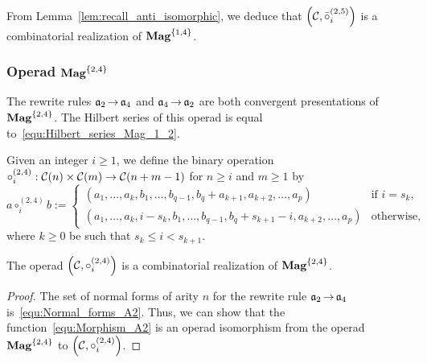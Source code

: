 From Lemma~\ref{lem:recall_anti_isomorphic}, we deduce that
$\left(\mathcal{C}, \bar{\circ}_i^{(2,5)}\right)$ is a combinatorial
realization of $\mathbf{Mag}^{\{1, 4\}}$.
\medbreak

\subsubsection{Operad $\mathbf{Mag}^{\{2, 4\}}$}
The rewrite rules $\mathfrak{a}_2 \operatorname{\to} \mathfrak{a}_4$ and $\mathfrak{a}_4 \operatorname{\to} \mathfrak{a}_2$ are both
convergent presentations of $\mathbf{Mag}^{\{2, 4\}}$. The Hilbert series of
this operad is equal to~\eqref{equ:Hilbert_series_Mag_1_2}.
\medbreak

Given an integer $i \geq 1$, we define the
binary operation
$\circ_i^{(2,4)} : \mathcal{C}(n) \times \mathcal{C}(m)\rightarrow
 \mathcal{C}(n + m - 1)$ for
$n \geq i$ and $m \geq 1$ by
\begin{equation}
    a \circ_i^{(2,4)} b :=
    \begin{cases}
    (a_1, \dots, a_{k}, b_1, \dots, b_{q-1}, b_{q} + a_{k+1},
    a_{k+2}, \dots ,a_{p}) & \mbox{if } i = s_k, \\
    (a_1, \dots, a_{k}, i - s_{k}, b_1, \dots, b_{q-1}, b_{q}
     + s_{k+1} - i, a_{k+2}, \dots ,a_{p}) & \mbox{otherwise},
    \end{cases}
\end{equation}
where $k \geq 0$  be such that $s_k \leq i < s_{k+1}$.
\medbreak

\begin{Proposition} \label{prop:Realisation_Mag_2_4}
  The operad $\left(\mathcal{C}, \circ_i^{(2,4)}\right)$
  is a combinatorial realization of $\mathbf{Mag}^{\{2, 4\}}$.
\end{Proposition}

\begin{proof}
  The set of normal forms of arity $n$ for the rewrite rule
  $\mathfrak{a}_2 \operatorname{\to} \mathfrak{a}_4$ is~\eqref{equ:Normal_forms_A2}. Thus, we can show
  that the function~\eqref{equ:Morphism_A2} is an operad isomorphism from
  the operad $\mathbf{Mag}^{\{2, 4\}}$ to
  $\left(\mathcal{C}, \circ_i^{(2,4)}\right)$.
\end{proof}
\medbreak

